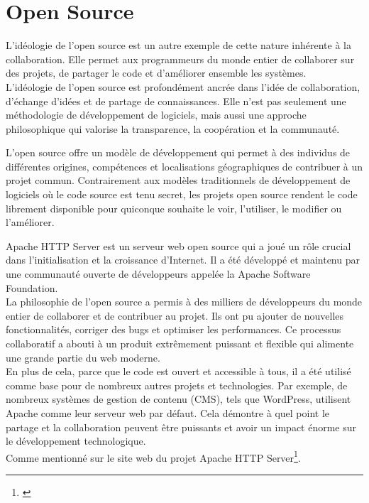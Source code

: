 \section{Open Source} 
L'idéologie de l'open source est un autre exemple de cette nature inhérente à la collaboration. Elle permet aux programmeurs du monde entier de collaborer sur des projets, de partager le code et d'améliorer ensemble les systèmes.\\

L'idéologie de l'open source est profondément ancrée dans l'idée de collaboration, d'échange d'idées et de partage de connaissances. Elle n'est pas seulement une méthodologie de développement de logiciels, mais aussi une approche philosophique qui valorise la transparence, la coopération et la communauté.

L'open source offre un modèle de développement qui permet à des individus de différentes origines, compétences et localisations géographiques de contribuer à un projet commun. Contrairement aux modèles traditionnels de développement de logiciels où le code source est tenu secret, les projets open source rendent le code librement disponible pour quiconque souhaite le voir, l'utiliser, le modifier ou l'améliorer.

Apache HTTP Server est un serveur web open source qui a joué un rôle crucial dans l'initialisation et la croissance d'Internet. Il a été développé et maintenu par une communauté ouverte de développeurs appelée la Apache Software Foundation.\\
La philosophie de l'open source a permis à des milliers de développeurs du monde entier de collaborer et de contribuer au projet. Ils ont pu ajouter de nouvelles fonctionnalités, corriger des bugs et optimiser les performances. Ce processus collaboratif a abouti à un produit extrêmement puissant et flexible qui alimente une grande partie du web moderne.\\
En plus de cela, parce que le code est ouvert et accessible à tous, il a été utilisé comme base pour de nombreux autres projets et technologies. Par exemple, de nombreux systèmes de gestion de contenu (CMS), tels que WordPress, utilisent Apache comme leur serveur web par défaut. Cela démontre à quel point le partage et la collaboration peuvent être puissants et avoir un impact énorme sur le développement technologique.\\

Comme mentionné sur le site web du projet Apache HTTP Server\footnote{\cite{apache}}.

